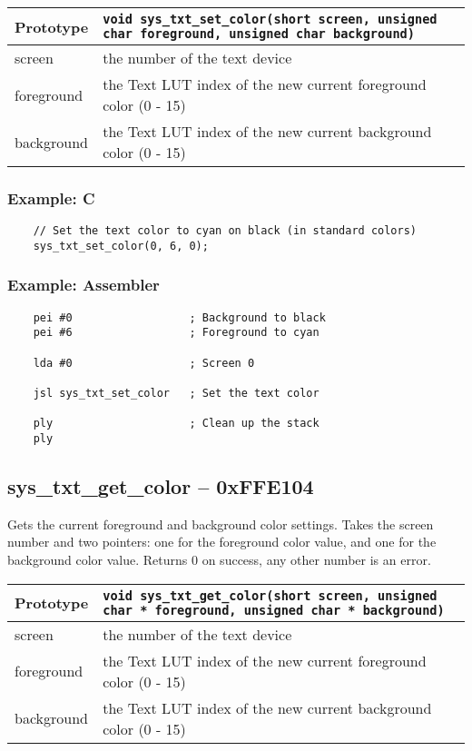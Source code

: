 \bigskip

\begin{tabular}{|l||l|} \hline
Prototype & \lstinline!void sys_txt_set_color(short screen, unsigned char foreground, unsigned char background)! \\ \hline
screen & the number of the text device \\ \hline
foreground & the Text LUT index of the new current foreground color (0 - 15) \\ \hline
background & the Text LUT index of the new current background color (0 - 15) \\ \hline
\end{tabular}

\subsubsection*{Example: C}
\begin{lstlisting}
    // Set the text color to cyan on black (in standard colors)
    sys_txt_set_color(0, 6, 0);
\end{lstlisting}

\subsubsection*{Example: Assembler}
\begin{verbatim}
    pei #0                  ; Background to black
    pei #6                  ; Foreground to cyan

    lda #0                  ; Screen 0

    jsl sys_txt_set_color   ; Set the text color

    ply                     ; Clean up the stack
    ply
\end{verbatim}


\subsection*{sys\_txt\_get\_color -- 0xFFE104}
Gets the current foreground and background color settings.
Takes the screen number and two pointers: one for the foreground color value, and one for the background color value.
Returns 0 on success, any other number is an error.

\bigskip

\begin{tabular}{|l||l|} \hline
Prototype & \lstinline!void sys_txt_get_color(short screen, unsigned char * foreground, unsigned char * background)! \\ \hline
screen & the number of the text device \\ \hline
foreground & the Text LUT index of the new current foreground color (0 - 15) \\ \hline
background & the Text LUT index of the new current background color (0 - 15) \\ \hline
\end{tabular}

